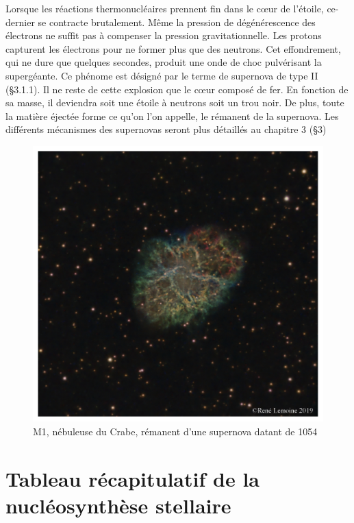 Lorsque les réactions thermonucléaires prennent fin dans le cœur de l’étoile, ce-dernier se contracte brutalement. Même la pression de dégénérescence des électrons ne suffit pas à compenser la pression gravitationnelle. Les protons capturent les électrons pour ne former plus que des neutrons. Cet effondrement, qui ne dure que quelques secondes, produit une onde de choc pulvérisant la supergéante. Ce phénome est désigné par le terme de supernova de type II (§3.1.1). Il ne reste de cette explosion que le cœur composé de fer. En fonction de sa masse, il deviendra soit une étoile à neutrons soit un trou noir. De plus, toute la matière éjectée forme ce qu’on l’on appelle, le rémanent de la supernova. Les différents mécanismes des supernovas seront plus détaillés au chapitre 3 (§3) 

\begin{figure}[H]
	\centering
	\includegraphics[scale=0.3]{images/m1}
	\caption{M1, nébuleuse du Crabe, rémanent d'une supernova datant de 1054}
\end{figure}

\section{Tableau récapitulatif de la nucléosynthèse stellaire}

